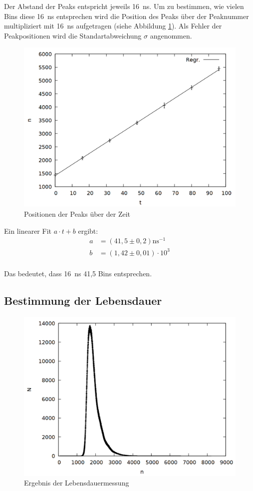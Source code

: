 Der Abstand der Peaks entspricht jeweils \SI{16}{\nano\second}. Um zu bestimmen, wie vielen Bins diese \SI{16}{\nano\second} entsprechen wird die Position des Peaks über der Peaknummer multipliziert mit \SI{16}{\nano\second} aufgetragen (siehe Abbildung \ref{fig:prompt_time}). Als Fehler der Peakpositionen wird die Standartabweichung $\sigma$ angenommen.  

\begin{figure}
\centering
\includegraphics[width=0.7\linewidth]{data/prompt_time.png}
\caption{Positionen der Peaks über der Zeit}
\label{fig:prompt_time}
\end{figure}

Ein linearer Fit $a\cdot t + b$ ergibt:\\
\begin{align*}
a &= (41,5 \pm 0,2) \si{\nano\second}^{-1}\\
b &= (1,42 \pm 0,01) \cdot 10^{3}\\
\end{align*}

Das bedeutet, dass \SI{16}{\nano\second} 41,5 Bins entsprechen.

\subsection{Bestimmung der Lebensdauer}

\begin{figure}
\centering
\includegraphics[width=0.7\linewidth]{data/uebernacht.png}
\caption{Ergebnis der Lebensdauermessung}
\label{fig:halflife}
\end{figure}

